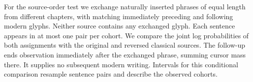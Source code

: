 For the source-order test we exchange naturally inserted phrases of equal length from different chapters, with matching immediately preceding and following modern glyphs. Neither source contains any exchanged glyph. Each sentence appears in at most one pair per cohort. We compare the joint log probabilities of both assignments with the original and reversed classical sources. The follow-up ends observation immediately after the exchanged phrase, summing cursor mass there. It supplies no subsequent modern writing. Intervals for this conditional comparison resample sentence pairs and describe the observed cohorts.
